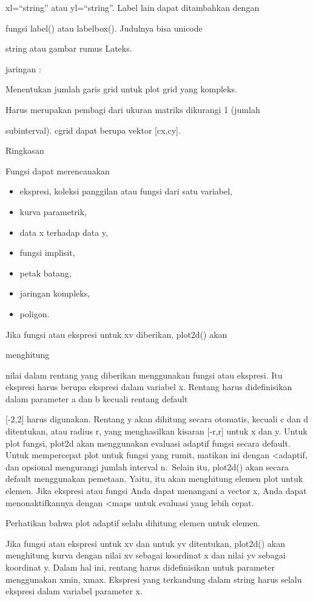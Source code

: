 \documentclass[
]{book}
\begin{document}
xl=``string'' atau yl=``string''. Label lain dapat ditambahkan dengan

fungsi label() atau labelbox(). Judulnya bisa unicode

string atau gambar rumus Lateks.

jaringan :

Menentukan jumlah garis grid untuk plot grid yang kompleks.

Harus merupakan pembagi dari ukuran matriks dikurangi 1 (jumlah

subinterval). cgrid dapat berupa vektor {[}cx,cy{]}.

Ringkasan

Fungsi dapat merencanakan

\begin{itemize}
\item
  ekspresi, koleksi panggilan atau fungsi dari satu variabel,
\item
  kurva parametrik,
\item
  data x terhadap data y,
\item
  fungsi implisit,
\item
  petak batang,
\item
  jaringan kompleks,
\item
  poligon.
\end{itemize}

Jika fungsi atau ekspresi untuk xv diberikan, plot2d() akan

menghitung

nilai dalam rentang yang diberikan menggunakan fungsi atau ekspresi. Itu ekspresi harus berupa ekspresi dalam variabel x. Rentang harus didefinisikan dalam parameter a dan b kecuali rentang default

{[}-2,2{]} harus digunakan. Rentang y akan dihitung secara otomatis, kecuali c dan d ditentukan, atau radius r, yang menghasilkan kisaran {[}-r,r{]} untuk x dan y. Untuk plot fungsi, plot2d akan menggunakan evaluasi adaptif fungsi secara default. Untuk mempercepat plot untuk fungsi yang rumit, matikan ini dengan \textless adaptif, dan opsional mengurangi jumlah interval n.~Selain itu, plot2d() akan secara default menggunakan pemetaan. Yaitu, itu akan menghitung elemen plot untuk elemen. Jika ekspresi atau fungsi Anda dapat menangani a vector x, Anda dapat menonaktifkannya dengan \textless maps untuk evaluasi yang lebih cepat.

Perhatikan bahwa plot adaptif selalu dihitung elemen untuk elemen.

Jika fungsi atau ekspresi untuk xv dan untuk yv ditentukan, plot2d() akan menghitung kurva dengan nilai xv sebagai koordinat x dan nilai yv sebagai koordinat y. Dalam hal ini, rentang harus didefinisikan untuk parameter menggunakan xmin, xmax. Ekspresi yang terkandung dalam string harus selalu ekspresi dalam variabel parameter x.
\end{document}
